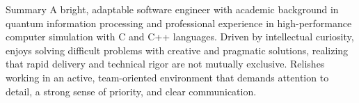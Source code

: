 \documentclass{resume} %
\begin{document}
%
\begin{rSection}{Summary}
A bright, adaptable software engineer with academic background in quantum information processing and professional experience in high-performance computer simulation with C and C++ languages. Driven by intellectual curiosity, enjoys solving difficult problems with creative and pragmatic solutions, realizing that rapid delivery and technical rigor are not mutually exclusive. Relishes working in an active, team-oriented environment that demands attention to detail, a strong sense of priority, and clear communication.
\end{rSection}

\end{document}
